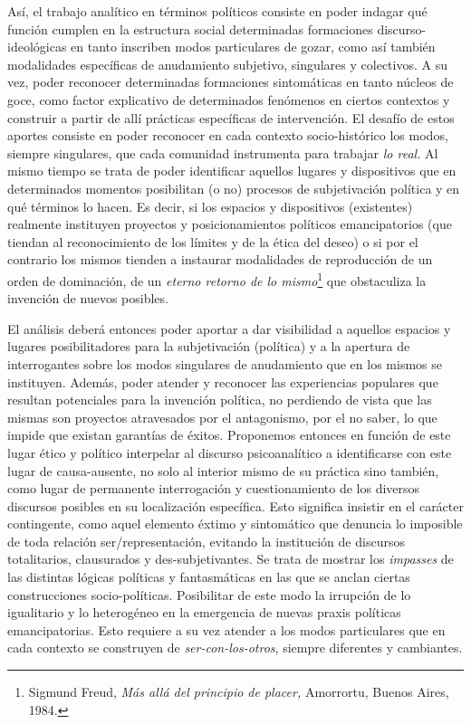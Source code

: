 Así, el trabajo analítico en términos políticos consiste en poder
indagar qué función cumplen en la estructura social determinadas
formaciones discurso-ideológicas en tanto inscriben modos particulares
de gozar, como así también modalidades específicas de anudamiento
subjetivo, singulares y colectivos. A su vez, poder reconocer
determinadas formaciones sintomáticas en tanto núcleos de goce, como
factor explicativo de determinados fenómenos en ciertos contextos y
construir a partir de allí prácticas específicas de intervención. El
desafío de estos aportes consiste en poder reconocer en cada contexto
socio-histórico los modos, siempre singulares, que cada comunidad
instrumenta para trabajar \emph{lo real.} Al mismo tiempo se trata de
poder identificar aquellos lugares y dispositivos que en determinados
momentos posibilitan (o no) procesos de subjetivación política y en qué
términos lo hacen. Es decir, si los espacios y dispositivos (existentes)
realmente instituyen proyectos y posicionamientos políticos
emancipatorios (que tiendan al reconocimiento de los límites y de la
ética del deseo) o si por el contrario los mismos tienden a instaurar
modalidades de reproducción de un orden de dominación, de un
\emph{eterno retorno de lo mismo}\footnote{Sigmund Freud, \emph{Más allá
  del principio de placer,} Amorrortu, Buenos Aires, 1984.} que
obstaculiza la invención de nuevos posibles.

El análisis deberá entonces poder aportar a dar visibilidad a aquellos
espacios y lugares posibilitadores para la subjetivación (política) y a
la apertura de interrogantes sobre los modos singulares de anudamiento
que en los mismos se instituyen. Además, poder atender y reconocer las
experiencias populares que resultan potenciales para la invención
política, no perdiendo de vista que las mismas son proyectos atravesados
por el antagonismo, por el no saber, lo que impide que existan garantías
de éxitos. Proponemos entonces en función de este lugar ético y político
interpelar al discurso psicoanalítico a identificarse con este lugar de
causa-ausente, no solo al interior mismo de su práctica sino también,
como lugar de permanente interrogación y cuestionamiento de los diversos
discursos posibles en su localización específica. Esto significa
insistir en el carácter contingente, como aquel elemento éxtimo y
sintomático que denuncia lo imposible de toda relación
ser/representación, evitando la institución de discursos totalitarios,
clausurados y des-subjetivantes. Se trata de mostrar los \emph{impasses}
de las distintas lógicas políticas y fantasmáticas en las que se anclan
ciertas construcciones socio-políticas. Posibilitar de este modo la
irrupción de lo igualitario y lo heterogéneo en la emergencia de nuevas
praxis políticas emancipatorias. Esto requiere a su vez atender a los
modos particulares que en cada contexto se construyen de
\emph{ser-con-los-otros}, siempre diferentes y cambiantes.

